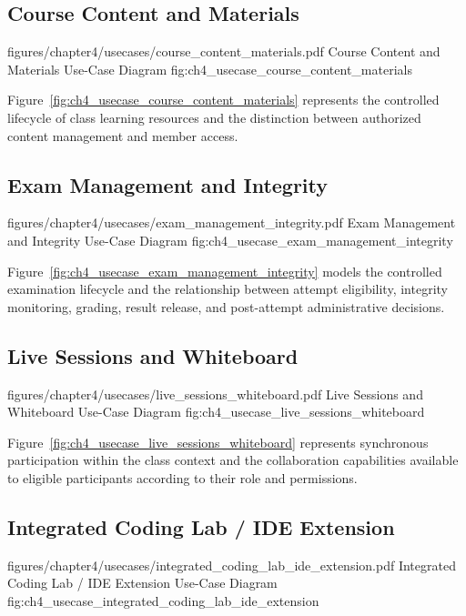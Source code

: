\subsection*{Course Content and Materials}

\EduUseCasePdfFigure
  {figures/chapter4/usecases/course_content_materials.pdf}
  {Course Content and Materials Use-Case Diagram}
  {fig:ch4_usecase_course_content_materials}

Figure~\ref{fig:ch4_usecase_course_content_materials} represents the controlled
lifecycle of class learning resources and the distinction between authorized
content management and member access.

\subsection*{Exam Management and Integrity}

\EduUseCasePdfFigure
  {figures/chapter4/usecases/exam_management_integrity.pdf}
  {Exam Management and Integrity Use-Case Diagram}
  {fig:ch4_usecase_exam_management_integrity}

Figure~\ref{fig:ch4_usecase_exam_management_integrity} models the controlled
examination lifecycle and the relationship between attempt eligibility,
integrity monitoring, grading, result release, and post-attempt administrative
decisions.

\subsection*{Live Sessions and Whiteboard}

\EduUseCasePdfFigure
  {figures/chapter4/usecases/live_sessions_whiteboard.pdf}
  {Live Sessions and Whiteboard Use-Case Diagram}
  {fig:ch4_usecase_live_sessions_whiteboard}

Figure~\ref{fig:ch4_usecase_live_sessions_whiteboard} represents synchronous
participation within the class context and the collaboration capabilities
available to eligible participants according to their role and permissions.

\subsection*{Integrated Coding Lab / IDE Extension}

\EduUseCasePdfFigure
  {figures/chapter4/usecases/integrated_coding_lab_ide_extension.pdf}
  {Integrated Coding Lab / IDE Extension Use-Case Diagram}
  {fig:ch4_usecase_integrated_coding_lab_ide_extension}

